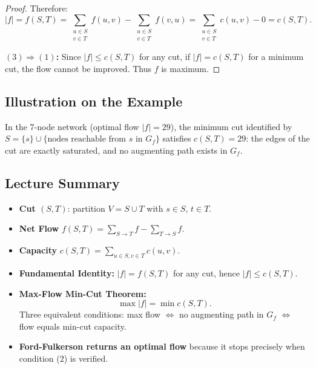 \begin{proof}
Therefore:
\[
  |f| = f(S,T) = \sum_{\substack{u\in S\\v\in T}} f(u,v) - \sum_{\substack{u\in S\\v\in T}} f(v,u)
       = \sum_{\substack{u\in S\\v\in T}} c(u,v) - 0 = c(S,T).
\]

\textbf{$(3) \Rightarrow (1)$:} Since $|f| \le c(S,T)$ for any cut,
if $|f| = c(S,T)$ for a minimum cut, the flow cannot be improved. Thus $f$ is maximum.
\end{proof}

\subsection{Illustration on the Example}

In the 7-node network (optimal flow $|f| = 29$), the minimum cut identified by
$S = \{s\} \cup \{\text{nodes reachable from }s\text{ in }G_f\}$ satisfies
$c(S,T) = 29$: the edges of the cut are exactly saturated, and no augmenting
path exists in $G_f$.

\subsection{Lecture Summary}

\begin{tcolorbox}[colback=lightblue, colframe=keyblue, fonttitle=\bfseries,
                  title={Key Points – Flows and Cuts}]
\begin{itemize}[noitemsep]
  \item \textbf{Cut $(S,T)$}: partition $V = S \cup T$ with $s \in S$, $t \in T$.
  \item \textbf{Net Flow} $f(S,T) = \sum_{S \to T} f - \sum_{T \to S} f$.
  \item \textbf{Capacity} $c(S,T) = \sum_{u\in S, v\in T} c(u,v)$.
  \item \textbf{Fundamental Identity:} $|f| = f(S,T)$ for any cut,
        hence $|f| \le c(S,T)$.
  \item \textbf{Max-Flow Min-Cut Theorem:}
    \[
      \max |f| = \min c(S,T).
    \]
    Three equivalent conditions: max flow $\Leftrightarrow$ no augmenting
    path in $G_f$ $\Leftrightarrow$ flow equals min-cut capacity.
  \item \textbf{Ford-Fulkerson returns an optimal flow} because it stops
        precisely when condition (2) is verified.
\end{itemize}
\end{tcolorbox}